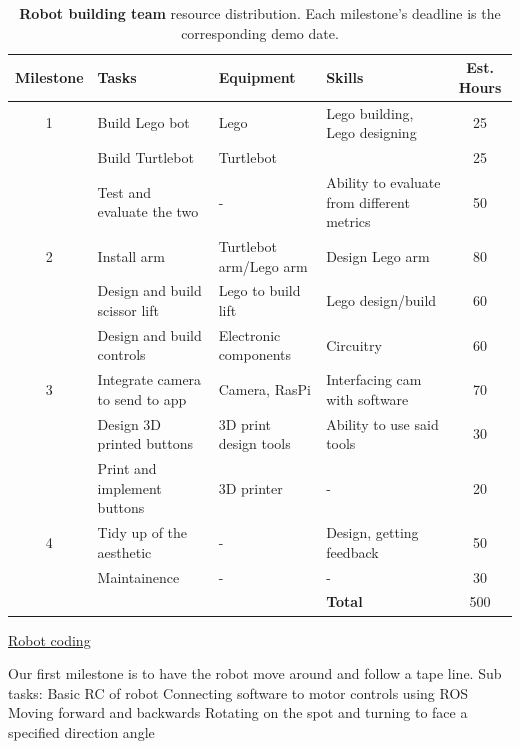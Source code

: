 \documentclass{article}
\begin{document}
\begin{table}[]
  \begin{center}
  \begin{small}
  \begin{tabular}{|c|l|l|l|c|}
    \hline
    {\bf Milestone} & {\bf Tasks} & {\bf Equipment} & {\bf Skills} & {\bf Est. Hours} \\ \hline
    1               & Build Lego bot & Lego & Lego building, Lego designing & 25 \\ \cline{2-5}
                    & Build Turtlebot & Turtlebot &  & 25 \\ \cline{2-5}
                    & Test and evaluate the two & - & Ability to evaluate from different metrics & 50 \\ \hline
    2               & Install arm & Turtlebot arm/Lego arm & Design Lego arm & 80 \\ \cline{2-5}
                    & Design and build scissor lift & Lego to build lift & Lego design/build & 60 \\ \cline{2-5}
                    & Design and build controls & Electronic components & Circuitry & 60 \\ \hline
    3               & Integrate camera to send to app & Camera, RasPi & Interfacing cam with software & 70 \\ \cline{2-5}
                    & Design 3D printed buttons & 3D print design tools & Ability to use said tools & 30 \\ \cline{2-5}
                    & Print and implement buttons & 3D printer & - & 20 \\ \hline
    4               & Tidy up of the aesthetic & - & Design, getting feedback & 50 \\ \cline{2-5}
                    & Maintainence & - & - & 30 \\ \hline
                    &                           &  & {\bf Total} & 500 \\ \hline
  \end{tabular}
  \end{small}
  \caption{{\bf Robot building team} resource distribution. Each milestone's deadline is the corresponding demo date.}
  \end{center}
\end{table}

\underline{Robot coding}

Our first milestone is to have the robot move around and follow a tape line.
Sub tasks: 
Basic RC of robot
    Connecting software to motor controls using ROS
    Moving forward and backwards
    Rotating on the spot and turning to face a specified direction angle
    
\end{document}

